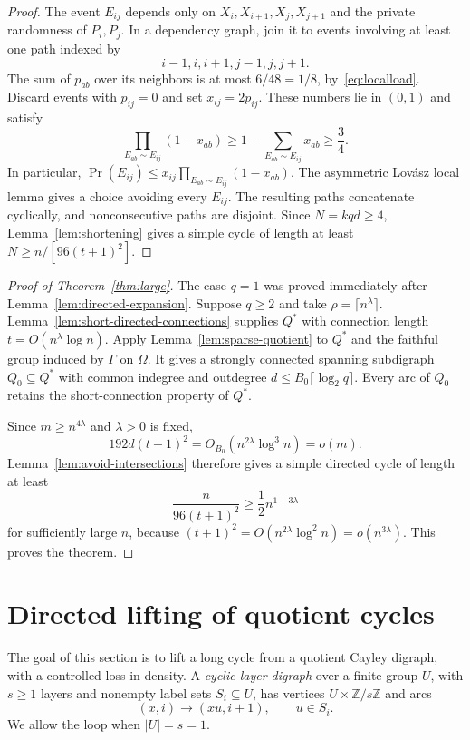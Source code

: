 \documentclass[11pt,a4paper,reqno]{amsart}
\theoremstyle{definition}
\theoremstyle{remark}
\numberwithin{equation}{section}
\newcommand{\Z}{\mathbb Z}
\begin{document}
\begin{proof}
The event $E_{ij}$ depends only on $X_i,X_{i+1},X_j,X_{j+1}$ and the private randomness of $P_i,P_j$. In a dependency graph, join it to events involving at least one path indexed by
\[
 i-1,i,i+1,j-1,j,j+1.
\]
The sum of $p_{ab}$ over its neighbors is at most $6/48=1/8$, by~\eqref{eq:localload}. Discard events with $p_{ij}=0$ and set $x_{ij}=2p_{ij}$. These numbers lie in $(0,1)$ and satisfy
\[
 \prod_{E_{ab}\sim E_{ij}}(1-x_{ab})
 \ge1-\sum_{E_{ab}\sim E_{ij}}x_{ab}\ge\frac34.
\]
In particular, $\Pr(E_{ij})\le x_{ij}\prod_{E_{ab}\sim E_{ij}}(1-x_{ab})$. The asymmetric Lov\'asz local lemma gives a choice avoiding every $E_{ij}$. The resulting paths concatenate cyclically, and nonconsecutive paths are disjoint. Since $N=kqd\ge4$, Lemma~\ref{lem:shortening} gives a simple cycle of length at least $N\ge n/[96(t+1)^2]$.
\end{proof}

\begin{proof}[Proof of Theorem~\ref{thm:large}]
The case $q=1$ was proved immediately after Lemma~\ref{lem:directed-expansion}. Suppose $q\ge2$ and take $\rho=\lceil n^\lambda\rceil$. Lemma~\ref{lem:short-directed-connections} supplies $Q^*$ with connection length $t=O(n^\lambda\log n)$. Apply Lemma~\ref{lem:sparse-quotient} to $Q^*$ and the faithful group induced by $\Gamma$ on $\Omega$. It gives a strongly connected spanning subdigraph $Q_0\subseteq Q^*$ with common indegree and outdegree $d\le B_0\lceil\log_2q\rceil$. Every arc of $Q_0$ retains the short-connection property of $Q^*$.

Since $m\ge n^{4\lambda}$ and $\lambda>0$ is fixed,
\[
 192d(t+1)^2=O_{B_0}(n^{2\lambda}\log^3n)=o(m).
\]
Lemma~\ref{lem:avoid-intersections} therefore gives a simple directed cycle of length at least
\[
 \frac{n}{96(t+1)^2}
 \ge \frac12n^{1-3\lambda}
\]
for sufficiently large $n$, because $(t+1)^2=O(n^{2\lambda}\log^2n)=o(n^{3\lambda})$. This proves the theorem.
\end{proof}


\section{Directed lifting of quotient cycles}\label{sec:local}
The goal of this section is to lift a long cycle from a quotient Cayley digraph, with a controlled loss in density. A \emph{cyclic layer digraph} over a finite group $U$, with $s\ge1$ layers and nonempty label sets $S_i\subseteq U$, has vertices $U\times\Z/s\Z$ and arcs
\begin{equation}\label{eq:layers}
 (x,i)\longrightarrow(xu,i+1),\qquad u\in S_i.
\end{equation}
We allow the loop when $|U|=s=1$.
\end{document}
